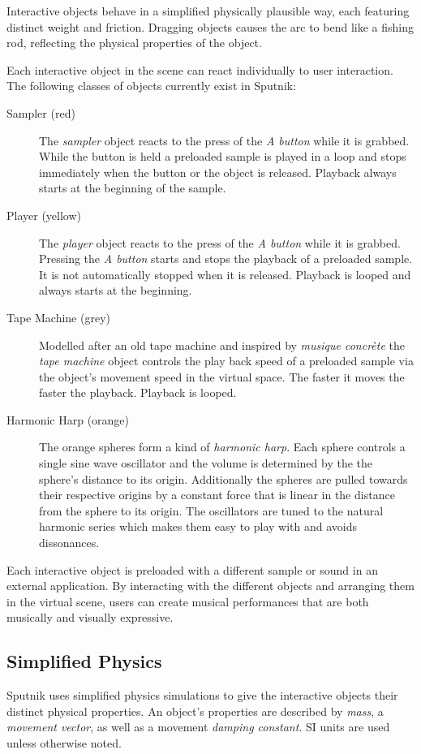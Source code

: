 \documentclass[10pt,a4paper]{scrartcl}
\begin{document}
Interactive objects behave in a simplified physically plausible way, each featuring distinct weight and friction. Dragging objects causes the arc to bend like a fishing rod, reflecting the physical properties of the object.

Each interactive object in the scene can react individually to user interaction. The following classes of objects currently exist in Sputnik:

\begin{description}
\item[Sampler (red)] The \emph{sampler} object reacts to the press of the \emph{A button} while it is grabbed. While the button is held a preloaded sample is played in a loop and stops immediately when the button or the object is released. Playback always starts at the beginning of the sample.

\item[Player (yellow)] The \emph{player} object reacts to the press of the \emph{A button} while it is grabbed. Pressing the \emph{A button} starts and stops the playback of a preloaded sample. It is not automatically stopped when it is released. Playback is looped and always starts at the beginning.

\item[Tape Machine (grey)] Modelled after an old tape machine and inspired by \emph{musique concrète} the \emph{tape machine} object controls the play back speed of a preloaded sample via the object's movement speed in the virtual space. The faster it moves the faster the playback. Playback is looped.

\item[Harmonic Harp (orange)] The orange spheres form a kind of \emph{harmonic harp}. Each sphere controls a single sine wave oscillator and the volume is determined by the the sphere's distance to its origin. Additionally the spheres are pulled towards their respective origins by a constant force that is linear in the distance from the sphere to its origin. The oscillators are tuned to the natural harmonic series which makes them easy to play with and avoids dissonances.
\end{description}

Each interactive object is preloaded with a different sample or sound in an external application. By interacting with the different objects and arranging them in the virtual scene, users can create musical performances that are both musically and visually expressive.


\subsection{Simplified Physics}
Sputnik uses simplified physics simulations to give the interactive objects their distinct physical properties. An object's properties are described by \emph{mass}, a \emph{movement vector}, as well as a movement \emph{damping constant}. SI units are used unless otherwise noted.
\end{document}
